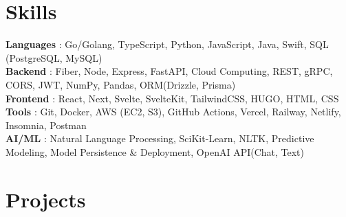 \documentclass[a4,10pt]{article}
\newenvironment{zitemize}{
\begin{itemize}\itemsep0pt \parskip0pt \parsep1pt}
{\end{itemize}\vspace{-0.5cm}}
\newcommand{\hskills}[1]{
\textbf{\bfseries #1} }
\begin{document}
\section{Skills}
\hskills{Languages}: {Go/Golang, TypeScript, Python, JavaScript,  Java, Swift, SQL (PostgreSQL, MySQL)}  \\
\hskills{Backend}: {Fiber, Node, Express, FastAPI, Cloud Computing, REST, gRPC, CORS, JWT, NumPy, Pandas, ORM(Drizzle, Prisma) }  \\
\hskills{Frontend}: {React, Next, Svelte, SvelteKit, TailwindCSS, HUGO, HTML, CSS} \\
\hskills{Tools}: {Git, Docker, AWS (EC2, S3), GitHub Actions, Vercel, Railway, Netlify, Insomnia, Postman} \\
\hskills{AI/ML}: {Natural Language Processing, SciKit-Learn, NLTK, Predictive Modeling, Model Persistence \& Deployment, OpenAI API(Chat, Text)}\\
\vspace{-0.2cm}







\section{Projects} %
\end{document}
